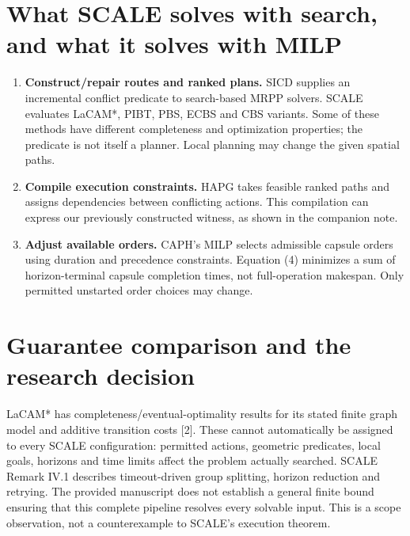 \documentclass[11pt,a4paper]{article}
\begin{document}
\section{What SCALE solves with search, and what it solves with MILP}
\begin{enumerate}
\item \textbf{Construct/repair routes and ranked plans.} SICD supplies an
incremental conflict predicate to search-based MRPP solvers. SCALE evaluates
LaCAM*, PIBT, PBS, ECBS and CBS variants. Some of these methods have different
completeness and optimization properties; the predicate is not itself a planner.
Local planning may change the given spatial paths.
\item \textbf{Compile execution constraints.} HAPG takes feasible ranked paths
and assigns dependencies between conflicting actions. This compilation can
express our previously constructed witness, as shown in the companion note.
\item \textbf{Adjust available orders.} CAPH's MILP selects admissible capsule
orders using duration and precedence constraints. Equation (4) minimizes a sum
of horizon-terminal capsule completion times, not full-operation makespan.
Only permitted unstarted order choices may change.
\end{enumerate}

\clearpage
\section{Guarantee comparison and the research decision}
LaCAM* has completeness/eventual-optimality results for its stated finite graph
model and additive transition costs [2]. These cannot automatically be assigned
to every SCALE configuration: permitted actions, geometric predicates, local
goals, horizons and time limits affect the problem actually searched. SCALE
Remark IV.1 describes timeout-driven group splitting, horizon reduction and
retrying. The provided manuscript does not establish a general finite bound
ensuring that this complete pipeline resolves every solvable input.
This is a scope observation, not a counterexample to SCALE's execution theorem.
\end{document}
